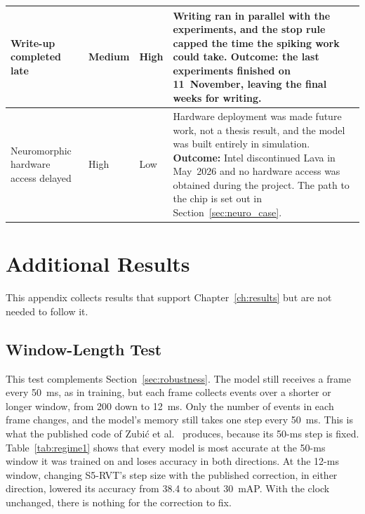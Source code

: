 \documentclass[11pt, a4paper]{report}
\begin{document}
\begin{table}[htbp]
\begin{tabularx}{\textwidth}{|>{\RaggedRight\arraybackslash}p{3.2cm}|l|l|>{\RaggedRight\arraybackslash}X|}
        Write-up completed late & Medium & High & Writing ran in parallel with the experiments, and the stop rule capped the time the spiking work could take. \textbf{Outcome:} the last experiments finished on 11~November, leaving the final weeks for writing. \\ \hline
        Neuromorphic hardware access delayed & High & Low & Hardware deployment was made future work, not a thesis result, and the model was built entirely in simulation. \textbf{Outcome:} Intel discontinued Lava in May~2026 and no hardware access was obtained during the project. The path to the chip is set out in Section~\ref{sec:neuro_case}. \\ \hline
    \end{tabularx}
\end{table}

\chapter{Additional Results}
\label{app:extra}
This appendix collects results that support Chapter~\ref{ch:results} but are not needed to follow it.

\section{Window-Length Test}
\label{app:window}
This test complements Section~\ref{sec:robustness}. The model still receives a frame every 50~ms, as in
training, but each frame collects events over a shorter or longer window, from 200 down to 12~ms. Only the
number of events in each frame changes, and the model's memory still takes one step every 50~ms. This is what
the published code of Zubi\'{c} et al.~\cite{zubic2024state} produces, because its 50-ms step is fixed.
Table~\ref{tab:regime1} shows that every model is most accurate at the 50-ms window it was trained on and
loses accuracy in both directions. At the 12-ms window, changing S5-RVT's step size with the published
correction, in either direction, lowered its accuracy from 38.4 to about 30~mAP. With the clock unchanged,
there is nothing for the correction to fix.
\end{document}
